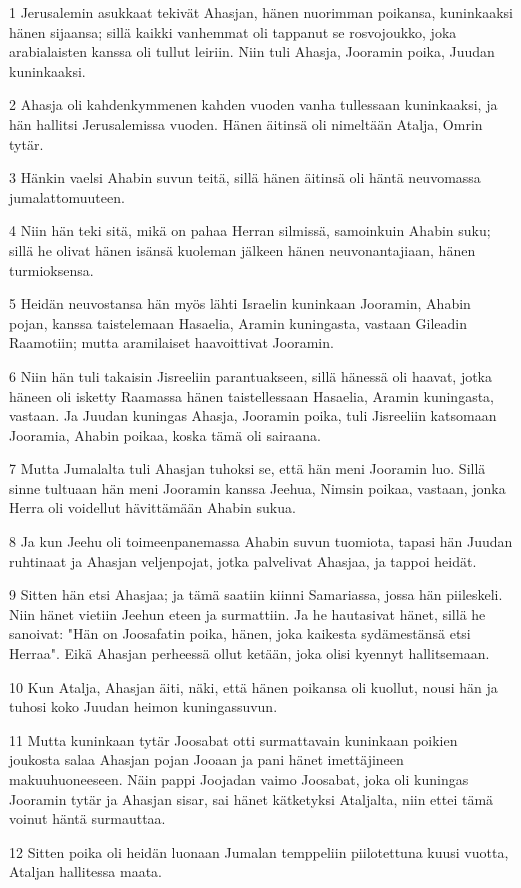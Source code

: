 \par 1 Jerusalemin asukkaat tekivät Ahasjan, hänen nuorimman poikansa, kuninkaaksi hänen sijaansa; sillä kaikki vanhemmat oli tappanut se rosvojoukko, joka arabialaisten kanssa oli tullut leiriin. Niin tuli Ahasja, Jooramin poika, Juudan kuninkaaksi.
\par 2 Ahasja oli kahdenkymmenen kahden vuoden vanha tullessaan kuninkaaksi, ja hän hallitsi Jerusalemissa vuoden. Hänen äitinsä oli nimeltään Atalja, Omrin tytär.
\par 3 Hänkin vaelsi Ahabin suvun teitä, sillä hänen äitinsä oli häntä neuvomassa jumalattomuuteen.
\par 4 Niin hän teki sitä, mikä on pahaa Herran silmissä, samoinkuin Ahabin suku; sillä he olivat hänen isänsä kuoleman jälkeen hänen neuvonantajiaan, hänen turmioksensa.
\par 5 Heidän neuvostansa hän myös lähti Israelin kuninkaan Jooramin, Ahabin pojan, kanssa taistelemaan Hasaelia, Aramin kuningasta, vastaan Gileadin Raamotiin; mutta aramilaiset haavoittivat Jooramin.
\par 6 Niin hän tuli takaisin Jisreeliin parantuakseen, sillä hänessä oli haavat, jotka häneen oli isketty Raamassa hänen taistellessaan Hasaelia, Aramin kuningasta, vastaan. Ja Juudan kuningas Ahasja, Jooramin poika, tuli Jisreeliin katsomaan Jooramia, Ahabin poikaa, koska tämä oli sairaana.
\par 7 Mutta Jumalalta tuli Ahasjan tuhoksi se, että hän meni Jooramin luo. Sillä sinne tultuaan hän meni Jooramin kanssa Jeehua, Nimsin poikaa, vastaan, jonka Herra oli voidellut hävittämään Ahabin sukua.
\par 8 Ja kun Jeehu oli toimeenpanemassa Ahabin suvun tuomiota, tapasi hän Juudan ruhtinaat ja Ahasjan veljenpojat, jotka palvelivat Ahasjaa, ja tappoi heidät.
\par 9 Sitten hän etsi Ahasjaa; ja tämä saatiin kiinni Samariassa, jossa hän piileskeli. Niin hänet vietiin Jeehun eteen ja surmattiin. Ja he hautasivat hänet, sillä he sanoivat: "Hän on Joosafatin poika, hänen, joka kaikesta sydämestänsä etsi Herraa". Eikä Ahasjan perheessä ollut ketään, joka olisi kyennyt hallitsemaan.
\par 10 Kun Atalja, Ahasjan äiti, näki, että hänen poikansa oli kuollut, nousi hän ja tuhosi koko Juudan heimon kuningassuvun.
\par 11 Mutta kuninkaan tytär Joosabat otti surmattavain kuninkaan poikien joukosta salaa Ahasjan pojan Jooaan ja pani hänet imettäjineen makuuhuoneeseen. Näin pappi Joojadan vaimo Joosabat, joka oli kuningas Jooramin tytär ja Ahasjan sisar, sai hänet kätketyksi Ataljalta, niin ettei tämä voinut häntä surmauttaa.
\par 12 Sitten poika oli heidän luonaan Jumalan temppeliin piilotettuna kuusi vuotta, Ataljan hallitessa maata.

